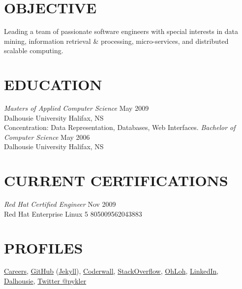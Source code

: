 \documentclass[line,margin]{res}
\begin{document}
\address{3139 Veith Street, Halifax, NS B3K 3G9}
\address{(902) 800-5288}


\begin{resume}

\section{OBJECTIVE}
    Leading a team of passionate software engineers with special
    interests in data mining, information retrieval {\&} processing, 
    micro-services, and distributed scalable computing.


\section{EDUCATION}
    {\sl Masters of Applied Computer Science} \hfill May 2009\\
        Dalhousie University \hfill Halifax, NS\\
        Concentration: Data Representation, Databases,
        Web Interfaces.  \medskip
    \newline
    {\sl Bachelor of Computer Science} \hfill May 2006\\
        Dalhousie University \hfill Halifax, NS

\section{CURRENT CERTIFICATIONS}
    {\sl Red Hat Certified Engineer} \hfill Nov 2009\\
        Red Hat Enterprise Linux 5 \hfill 805009562043883\\

\section{PROFILES}
    \href{http://careers.stackoverflow.com/hatem}{Careers},
    \href{https://github.com/pykler/}{GitHub} (\href{http://pykler.github.io/}{Jekyll}),
    \href{https://coderwall.com/pykler}{Coderwall},
    \href{http://stackexchange.com/users/385316/pykler}{StackOverflow},
    \href{https://www.ohloh.net/accounts/pykler}{OhLoh},
    \href{http://ca.linkedin.com/in/pykler/}{LinkedIn},
    \\
    \href{http://web.cs.dal.ca/~nassrat/hatem-nassrat.html}{Dalhousie},
    \href{https://twitter.com/pykler}{Twitter @pykler}


\end{resume}
\end{document}
